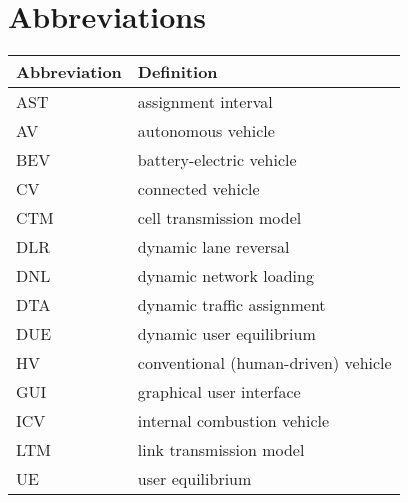 \chapter{Abbreviations}

\begin{longtable}{ll}
\hline
Abbreviation & Definition\\\hline
\endhead
AST & assignment interval\\
AV & autonomous vehicle\\
BEV & battery-electric vehicle\\
CV & connected vehicle \\
CTM &  cell transmission model~\cite{daganzo1994cell, daganzo1995cell}\\
DLR & dynamic lane reversal~\cite{levin2016cell, duell2016system} \\
DNL & dynamic network loading~\cite{chiu2011dynamic} \\
DTA & dynamic traffic assignment~\cite{chiu2011dynamic} \\
DUE & dynamic user equilibrium~\cite{wardrop1952road, chiu2011dynamic} \\
HV & conventional (human-driven) vehicle\\
GUI & graphical user interface\\
ICV & internal combustion vehicle\\
LTM & link transmission model~\cite{yperman2005link, yperman2007link}\\
UE & user equilibrium~\cite{wardrop1952road}\\
\hline
\end{longtable}